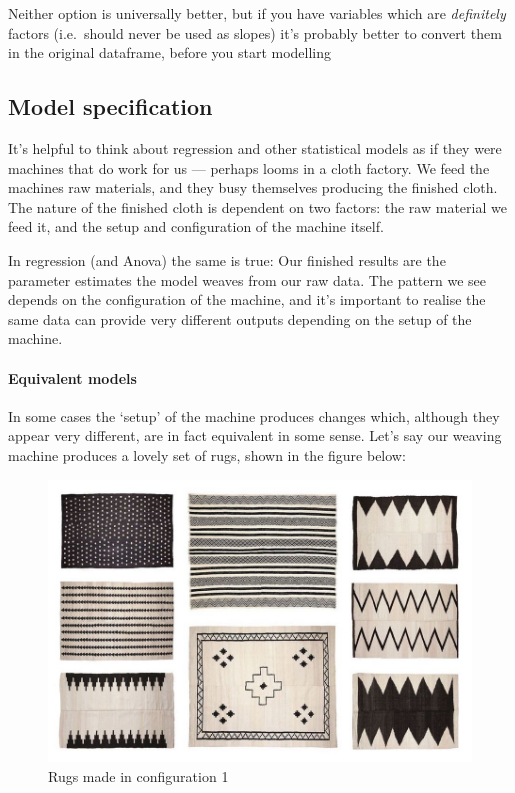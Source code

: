 \documentclass[]{article}
\let\oldparagraph\paragraph
\renewcommand{\paragraph}[1]{\oldparagraph{#1}\mbox{}}
\begin{document}
{Neither option is universally better, but if you have variables which are
\emph{definitely} factors (i.e.~should never be used as slopes) it's probably better
to convert them in the original dataframe, before you start
modelling}

\hypertarget{parameterisation}{%
\subsection*{Model specification}\label{parameterisation}}

It's helpful to think about regression and other statistical models as if they
were machines that do work for us --- perhaps looms in a cloth factory. We feed
the machines raw materials, and they busy themselves producing the finished
cloth. The nature of the finished cloth is dependent on two factors: the raw
material we feed it, and the setup and configuration of the machine itself.

In regression (and Anova) the same is true: Our finished results are the
parameter estimates the model weaves from our raw data. The pattern we see
depends on the configuration of the machine, and it's important to realise the
same data can provide very different outputs depending on the setup of the
machine.

\hypertarget{equivalent-models}{%
\paragraph{Equivalent models}\label{equivalent-models}}

In some cases the `setup' of the machine produces changes which, although they
appear very different, are in fact equivalent in some sense. Let's say our
weaving machine produces a lovely set of rugs, shown in the figure below:

\begin{figure}
\centering
\includegraphics{media/rugs1.jpg}
\caption{Rugs made in configuration 1}
\end{figure}
\end{document}
